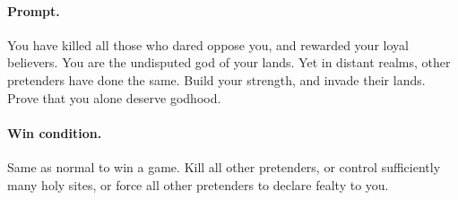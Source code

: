 \documentclass[12pt,letterpaper]{article}
\begin{document}
\paragraph{Prompt.}
You have killed all those who dared oppose you,
and rewarded your loyal believers.
You are the undisputed god of your lands.
Yet in distant realms,
other pretenders have done the same.
Build your strength,
and invade their lands.
Prove that you alone deserve godhood.


\paragraph{Win condition.}
Same as normal to win a game.
Kill all other pretenders,
or control sufficiently many holy sites,
or force all other pretenders to declare fealty to you.
\end{document}
